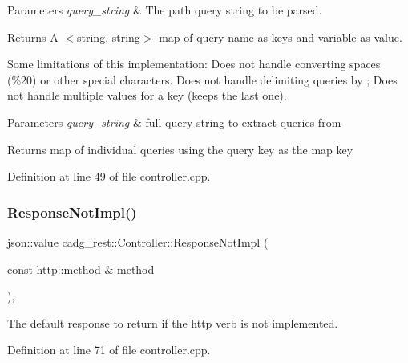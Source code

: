 \begin{DoxyParams}{Parameters}
{\em query\+\_\+string} & The path query string to be parsed. \\
\hline
\end{DoxyParams}
\begin{DoxyReturn}{Returns}
A $<$string, string$>$ map of query name as keys and variable as value.
\end{DoxyReturn}
Some limitations of this implementation\+: Does not handle converting spaces (\%20) or other special characters. Does not handle delimiting queries by \textquotesingle{};\textquotesingle{} Does not handle multiple values for a key (keeps the last one). 
\begin{DoxyParams}{Parameters}
{\em query\+\_\+string} & full query string to extract queries from \\
\hline
\end{DoxyParams}
\begin{DoxyReturn}{Returns}
map of individual queries using the query key as the map key 
\end{DoxyReturn}


Definition at line 49 of file controller.\+cpp.

\mbox{\label{classcadg__rest_1_1_controller_ae3bafe4b6830500e7f802853ded2a40d}} 
\subsubsection{\texorpdfstring{ResponseNotImpl()}{ResponseNotImpl()}}
{\footnotesize\ttfamily json\+::value cadg\+\_\+rest\+::\+Controller\+::\+Response\+Not\+Impl (\begin{DoxyParamCaption}\item[{const http\+::method \&}]{method }\end{DoxyParamCaption})\hspace{0.3cm}{\ttfamily [static]}, {\ttfamily [protected]}}



The default response to return if the http verb is not implemented. 



Definition at line 71 of file controller.\+cpp.

\mbox{\label{classcadg__rest_1_1_controller_a0a3930fbecd66d40b2455557c1c46e47}} 
